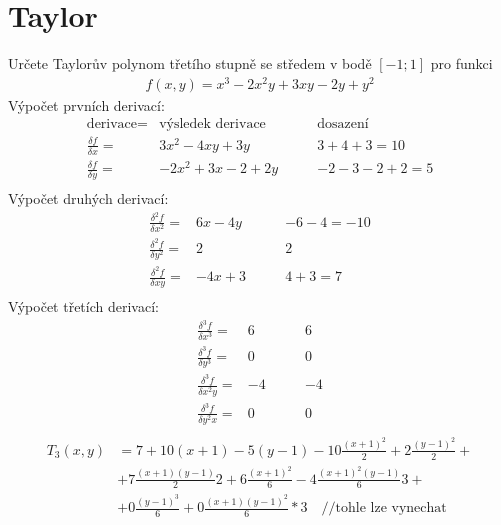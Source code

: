 \documentclass{article}
\begin{document}
\section{Taylor}
Určete Taylorův polynom třetího stupně se středem v bodě $[-1;1]$ pro funkci
\begin{eqnarray*}
f(x,y)=x^3-2x^2 y+3xy-2y+y^2
\end{eqnarray*}
Výpočet prvních derivací:
\begin{eqnarray*}
\text{derivace}=&\text{výsledek derivace}\qquad&\text{dosazení}\\
\frac{\delta f}{\delta x}=&3x^2 -4xy+3y \qquad & 3+4+3=10\\
\frac{\delta f}{\delta y}=&-2x^2 +3x-2+2y \qquad & -2-3-2+2=5\\
\end{eqnarray*}
Výpočet druhých derivací:
\begin{eqnarray*}
\frac{\delta^2 f}{\delta x^2}=&6x-4y \qquad &-6-4=-10\\
\frac{\delta^2 f}{\delta y^2}=&2 \qquad &2\\
\frac{\delta^2 f}{\delta xy}=&-4x+3 \qquad &4+3=7\\
\end{eqnarray*}
Výpočet třetích derivací:
\begin{eqnarray*}
\frac{\delta^3 f}{\delta x^3}=&6 \qquad &6\\
\frac{\delta^3 f}{\delta y^3}=&0 \qquad &0\\
\frac{\delta^3 f}{\delta x^2y}=&-4 \qquad &-4\\
\frac{\delta^3 f}{\delta y^2x}=&0 \qquad &0\\
\end{eqnarray*}
\begin{equation*}
\begin{split}
T_3(x,y)&=7+10(x+1)-5(y-1)-10\frac{(x+1)^2}{2}+2\frac{(y-1)^2}{2}+\\
&+7\frac{(x+1)(y-1)}{2}2+6\frac{(x+1)^2}{6}-4\frac{(x+1)^2(y-1)}{6}3+\\
&+0\frac{(y-1)^3}{6}+0\frac{(x+1)(y-1)^2}{6}*3 \quad \text{//tohle lze vynechat}
\end{split}
\end{equation*}
\end{document}
